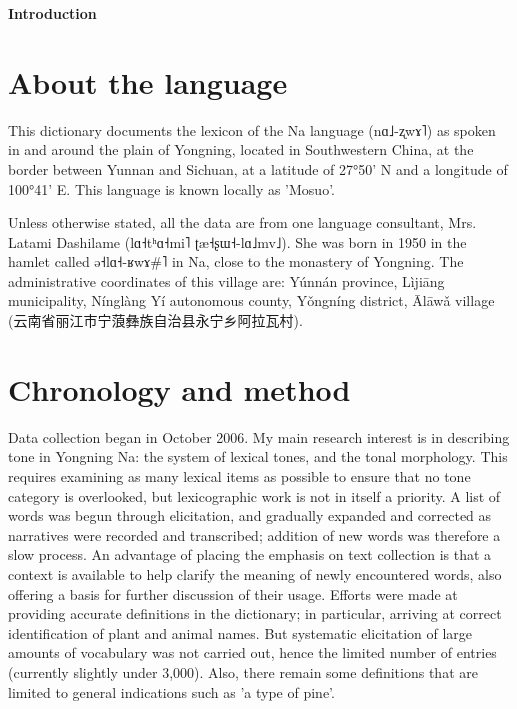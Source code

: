 \documentclass[oldfontcommands,oneside,a4paper,11pt]{article}
\newcommand{\ipa}[1]{{\phon #1}} %
\newcommand{\zh}[1]{{\cn #1}}
\begin{document}
 
	
	{\LARGE \textbf{Introduction}}
	\section{About the language} \label{sec:language}
	
	This dictionary documents the lexicon of the Na language (\ipa{nɑ˩-ʐwɤ˥}) as spoken in and around the plain of Yongning, located in Southwestern China, at the border between Yunnan and Sichuan, at a latitude of 27°50’ N and a longitude of 100°41’ E. This language is known locally as 'Mosuo'. 
	
	Unless otherwise stated, all the data are from one language consultant, Mrs. Latami Dashilame (\ipa{lɑ˧tʰɑ˧mi˥ ʈæ˧ʂɯ˧-lɑ˩mv˩}). She was born in 1950 in the hamlet called \ipa{ə˧lɑ˧-ʁwɤ\#˥} in Na, close to the monastery of Yongning. The administrative coordinates of this village are: Yúnnán province, Lìjiāng municipality, Nínglàng Yí autonomous county, Yǒngníng district, Ālāwǎ village (\zh{云南省丽江市宁蒗彝族自治县永宁乡阿拉瓦村}). 
	
	\section{Chronology and method} \label{sec:method}
	
	Data collection began in October 2006. My main research interest is in describing tone in Yongning Na: the system of lexical tones, and the tonal morphology. This requires examining as many lexical items as possible to ensure that no tone category is overlooked, but lexicographic work is not in itself a priority. A list of words was begun through elicitation, and gradually expanded and corrected as narratives were recorded and transcribed; addition of new words was therefore a slow process. An advantage of placing the emphasis on text collection is that a context is available to help clarify the meaning of newly encountered words, also offering a basis for further discussion of their usage. Efforts were made at providing accurate definitions in the dictionary; in particular, arriving at correct identification of plant and animal names. But systematic elicitation of large amounts of vocabulary was not carried out, hence the limited number of entries (currently slightly under 3,000). Also, there remain some definitions that are limited to general indications such as 'a type of pine'. 
	
\end{document}
